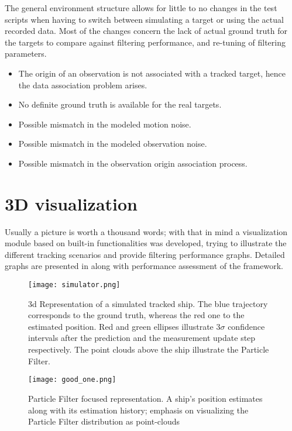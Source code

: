 The general environment structure allows for little to no changes in the test scripts when having to switch between simulating a target or using the actual recorded data. Most of the changes concern the lack of actual ground truth for the targets to compare against filtering performance, and re-tuning of filtering parameters.
\begin{itemize}
	\item  The origin of an observation is not associated with a tracked target, hence the data association problem arises.
	\item No definite ground truth is available for the real targets.
	\item Possible mismatch in the modeled motion noise.
	\item Possible mismatch in the modeled observation noise.
	\item Possible mismatch in the observation origin association process.
\end{itemize}

\section{3D visualization}

Usually a picture is worth a thousand words; with that in mind a visualization module based on \matlab built-in functionalities was developed, trying to illustrate the different tracking scenarios and provide filtering performance graphs. Detailed graphs are presented in  along with performance assessment of the framework.

\begin{figure}[H]
	\centering
	\texttt{[image: simulator.png]}
	\caption{3d Representation of a simulated tracked ship. The blue trajectory corresponds to the ground truth, whereas the red one  to the estimated position. Red and green ellipses illustrate $3\sigma$ confidence intervals after the prediction and the measurement update step respectively. The point clouds above the ship illustrate the Particle Filter.}
	\label{fig:simulator1}
\end{figure}

\begin{figure}[H]
	\centering
	\texttt{[image: good\_one.png]}
		\caption{Particle Filter focused representation. A ship's position estimates along with its estimation history; emphasis on visualizing the Particle Filter distribution as point-clouds}	\label{fig:simulator2}
\end{figure}


